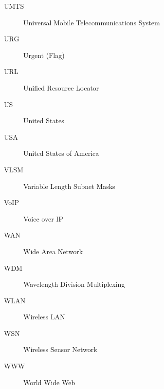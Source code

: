 \begin{description}
		\item[UMTS] Universal Mobile Telecommunications System
		\item[URG] Urgent (Flag)
		\item[URL] Unified Resource Locator
		\item[US] United States
		\item[USA] United States of America
		\item[VLSM] Variable Length Subnet Masks
		\item[VoIP] Voice over IP
		\item[WAN] Wide Area Network
		\item[WDM] Wavelength Division Multiplexing
		\item[WLAN] Wireless LAN
		\item[WSN] Wireless Sensor Network
		\item[WWW] World Wide Web
	\end{description}
